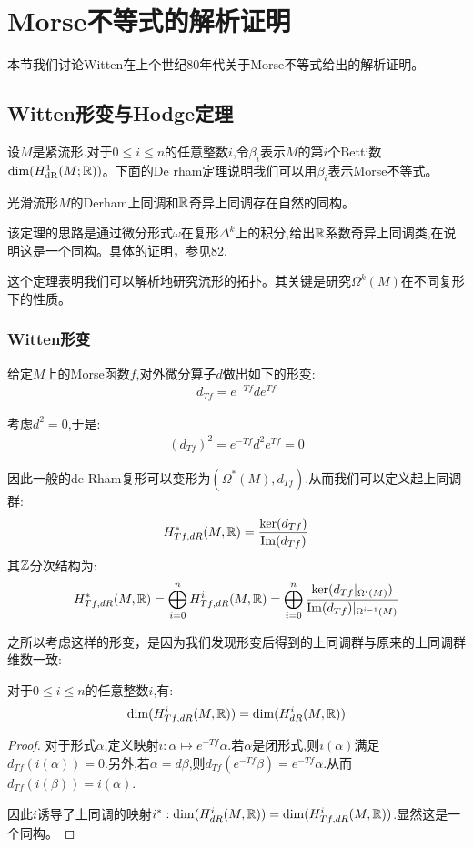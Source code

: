 \chapter{Morse不等式的解析证明}
本节我们讨论Witten在上个世纪80年代关于Morse不等式给出的解析证明。
\section{Witten形变与Hodge定理}
设$M$是紧流形.对于$0\leq  i\leq n$的任意整数$i$,令$\beta_i$表示$M$的第$i$个Betti数$\dim (H_{\mathrm{dR}}^1(M;\mathbb{R}))$。下面的De rham定理说明我们可以用$\beta_i$表示Morse不等式。
\begin{theorem}[De rham定理]
	光滑流形$M$的Derham上同调和$\mathbb{R}$奇异上同调存在自然的同构。
\end{theorem}
该定理的思路是通过微分形式$\omega$在复形$\Delta^k$上的积分,给出$\mathbb{R}$系数奇异上同调类,在说明这是一个同构。具体的证明，参见82.

这个定理表明我们可以解析地研究流形的拓扑。其关键是研究$\Omega^k(M)$在不同复形下的性质。

\subsection{Witten形变}
给定$M$上的Morse函数$f$,对外微分算子$d$做出如下的形变:
\begin{align}
	d_{Tf}=e^{-Tf}d e^{Tf}
\end{align}

考虑$d^2=0$,于是:
\begin{align*}
	(d_{Tf})^2=e^{-Tf}d^2 e^{Tf}=0
\end{align*}

因此一般的de Rham复形可以变形为$(\Omega^*(M),d_{Tf})$.从而我们可以定义起上同调群:
\begin{align*}
	H_{Tf,dR}^*(M,\mathbb{R})=\frac{\ker(d_{Tf})}{\mathrm{Im}(d_{Tf})}
\end{align*}
其$\mathbb{Z}$分次结构为:
\begin{align*}
	H_{Tf,dR}^*(M,\mathbb{R})=\bigoplus_{i=0}^n H_{Tf,dR}^i(M,\mathbb{R})=\bigoplus_{i=0}^n \frac{\ker(d_{Tf}|_{\Omega^i(M)})}{\mathrm{Im}(d_{Tf})|_{\Omega^{i-1}(M)}}
\end{align*}

之所以考虑这样的形变，是因为我们发现形变后得到的上同调群与原来的上同调群维数一致:
\begin{proposition}
	对于$0 \leq i \leq n$的任意整数$i$,有:
	\begin{align*}
		\mathrm{dim}(H^i_{Tf,dR}(M,\mathbb{R}))=\mathrm{dim}(H^i_{dR}(M,\mathbb{R}))
	\end{align*}
\end{proposition}
\begin{proof}
	对于形式$\alpha$,定义映射$i:\alpha \mapsto e^{-Tf}\alpha$.若$\alpha$是闭形式,则$i(\alpha)$满足$d_{Tf}(i(\alpha))=0$.另外,若$\alpha=d \beta$,则$d_{Tf}(e^{-Tf}\beta)=e^{-Tf}\alpha$.从而$d_{Tf}(i(\beta))=i(\alpha)$.

	因此$i$诱导了上同调的映射$i^*:\mathrm{dim}(H^i_{dR}(M,\mathbb{R}))=\mathrm{dim}(H^i_{Tf,dR}(M,\mathbb{R}))$.显然这是一个同构。

\end{proof}
